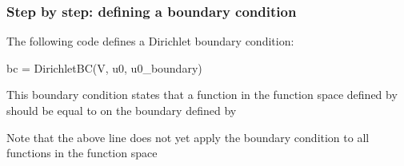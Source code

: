 \begin{frame}[fragile]
  \frametitle{Step by step: defining a boundary condition}

  The following code defines a Dirichlet boundary condition:

\begin{python}
bc = DirichletBC(V, u0, u0_boundary)
\end{python}

  \bigskip

  This boundary condition states that a function in the function space
  defined by  should be equal to  on the boundary
  defined by 

  \bigskip

  Note that the above line does not yet apply the boundary condition
  to all functions in the function space

\end{frame}
